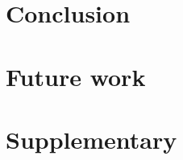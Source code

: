 \documentclass[10pt]{article}
\begin{document}
	\section{Conclusion}
	
	\label{section:Chap_Conclusion}
	\section{Future work}
	
	\label{section:Chap_Future_Work}
	\newpage
	
	
	\printbibliography
	\newpage
	
	\section*{Supplementary}
	
	\label{section:Chap_Supplementary}
	\newpage
	

	
	
\end{document}
